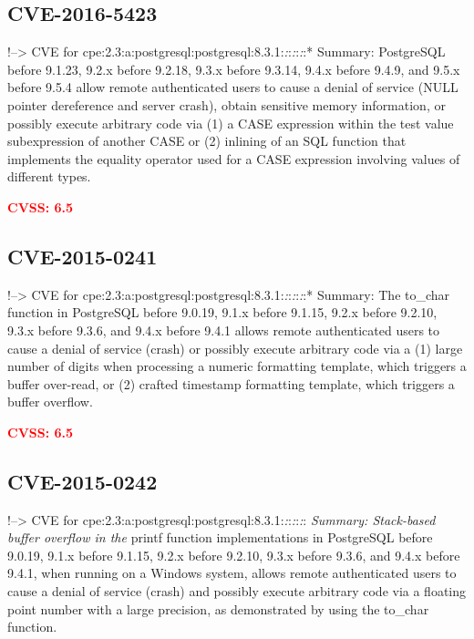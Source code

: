 \documentclass[a4paper, 12pt]{article}
\begin{document}
\hypertarget{cve-2016-5423}{%
\subsection{CVE-2016-5423}\label{cve-2016-5423}}

!--\textgreater{} CVE for
cpe:2.3:a:postgresql:postgresql:8.3.1:\emph{:}:\emph{:}:\emph{:}:*
Summary: PostgreSQL before 9.1.23, 9.2.x before 9.2.18, 9.3.x before
9.3.14, 9.4.x before 9.4.9, and 9.5.x before 9.5.4 allow remote
authenticated users to cause a denial of service (NULL pointer
dereference and server crash), obtain sensitive memory information, or
possibly execute arbitrary code via (1) a CASE expression within the
test value subexpression of another CASE or (2) inlining of an SQL
function that implements the equality operator used for a CASE
expression involving values of different types.

\textbf{\textcolor{red}{CVSS: 6.5}}

\hypertarget{cve-2015-0241}{%
\subsection{CVE-2015-0241}\label{cve-2015-0241}}

!--\textgreater{} CVE for
cpe:2.3:a:postgresql:postgresql:8.3.1:\emph{:}:\emph{:}:\emph{:}:*
Summary: The to\_char function in PostgreSQL before 9.0.19, 9.1.x before
9.1.15, 9.2.x before 9.2.10, 9.3.x before 9.3.6, and 9.4.x before 9.4.1
allows remote authenticated users to cause a denial of service (crash)
or possibly execute arbitrary code via a (1) large number of digits when
processing a numeric formatting template, which triggers a buffer
over-read, or (2) crafted timestamp formatting template, which triggers
a buffer overflow.

\textbf{\textcolor{red}{CVSS: 6.5}}

\hypertarget{cve-2015-0242}{%
\subsection{CVE-2015-0242}\label{cve-2015-0242}}

!--\textgreater{} CVE for
cpe:2.3:a:postgresql:postgresql:8.3.1:\emph{:}:\emph{:}:\emph{:}:\emph{
Summary: Stack-based buffer overflow in the }printf function
implementations in PostgreSQL before 9.0.19, 9.1.x before 9.1.15, 9.2.x
before 9.2.10, 9.3.x before 9.3.6, and 9.4.x before 9.4.1, when running
on a Windows system, allows remote authenticated users to cause a denial
of service (crash) and possibly execute arbitrary code via a floating
point number with a large precision, as demonstrated by using the
to\_char function.
\end{document}
